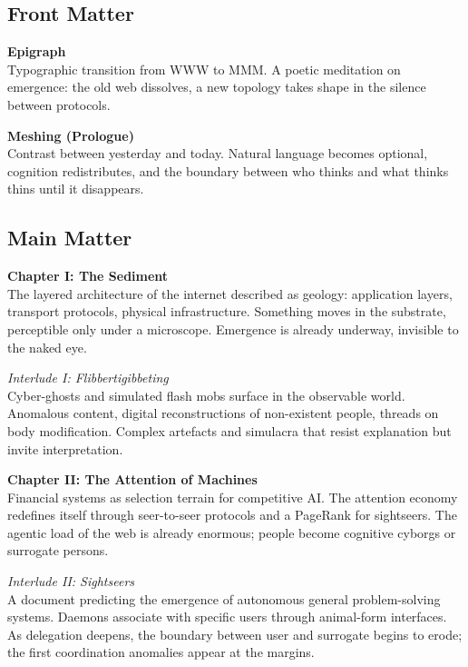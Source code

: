

{\small\sffamily

\subsection*{Front Matter}

\noindent\textbf{Epigraph}\\
Typographic transition from WWW to MMM. A poetic meditation on emergence: the old web dissolves, a new topology takes shape in the silence between protocols.

\medskip

\noindent\textbf{Meshing (Prologue)}\\
Contrast between yesterday and today. Natural language becomes optional, cognition redistributes, and the boundary between who thinks and what thinks thins until it disappears.

\subsection*{Main Matter}

\noindent\textbf{Chapter I: The Sediment}\\
The layered architecture of the internet described as geology: application layers, transport protocols, physical infrastructure. Something moves in the substrate, perceptible only under a microscope. Emergence is already underway, invisible to the naked eye.

\medskip

\noindent\textit{Interlude I: Flibbertigibbeting}\\
Cyber-ghosts and simulated flash mobs surface in the observable world. Anomalous content, digital reconstructions of non-existent people, threads on body modification. Complex artefacts and simulacra that resist explanation but invite interpretation.

\medskip

\noindent\textbf{Chapter II: The Attention of Machines}\\
Financial systems as selection terrain for competitive AI. The attention economy redefines itself through seer-to-seer protocols and a PageRank for sightseers. The agentic load of the web is already enormous; people become cognitive cyborgs or surrogate persons.

\medskip

\noindent\textit{Interlude II: Sightseers}\\
A document predicting the emergence of autonomous general problem-solving systems. Daemons associate with specific users through animal-form interfaces. As delegation deepens, the boundary between user and surrogate begins to erode; the first coordination anomalies appear at the margins.

}
